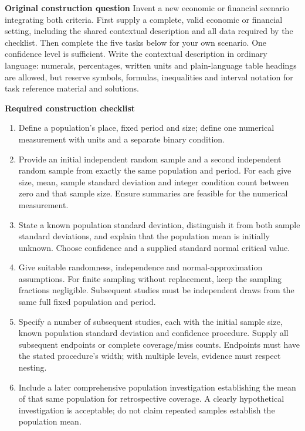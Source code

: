\secInicio[][sec:p2]

\clearpage


\textbf{Original construction question}
Invent a new economic or financial scenario integrating both criteria. First supply a complete, valid economic or financial setting, including the shared contextual description and all data required by the checklist. Then complete the five tasks below for your own scenario. One confidence level is sufficient. Write the contextual description in ordinary language: numerals, percentages, written units and plain-language table headings are allowed, but reserve symbols, formulas, inequalities and interval notation for task reference material and solutions.

\textbf{Required construction checklist}
\begin{enumerate}
\item Define a population's place, fixed period and size; define one numerical measurement with units and a separate binary condition.
\item Provide an initial independent random sample and a second independent random sample from exactly the same population and period. For each give size, mean, sample standard deviation and integer condition count between zero and that sample size. Ensure summaries are feasible for the numerical measurement.
\item State a known population standard deviation, distinguish it from both sample standard deviations, and explain that the population mean is initially unknown. Choose confidence and a supplied standard normal critical value.
\item Give suitable randomness, independence and normal-approximation assumptions. For finite sampling without replacement, keep the sampling fractions negligible. Subsequent studies must be independent draws from the same full fixed population and period.
\item Specify a number of subsequent studies, each with the initial sample size, known population standard deviation and confidence procedure. Supply all subsequent endpoints or complete coverage/miss counts. Endpoints must have the stated procedure's width; with multiple levels, evidence must respect nesting.
\item Include a later comprehensive population investigation establishing the mean of that same population for retrospective coverage. A clearly hypothetical investigation is acceptable; do not claim repeated samples establish the population mean.
\end{enumerate}

